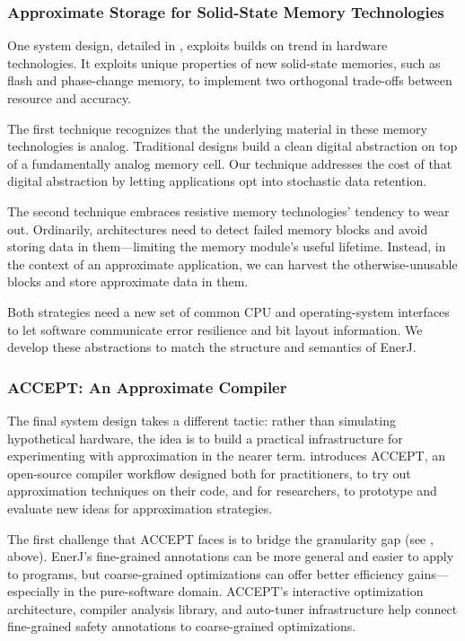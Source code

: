 \subsubsection{Approximate Storage for Solid-State Memory Technologies}

One system design, detailed in , exploits builds on trend in hardware technologies.
It exploits unique properties of new solid-state memories,
such as flash and phase-change memory,
to implement two orthogonal trade-offs between resource and accuracy.

The first technique recognizes that the underlying material in these memory
technologies is analog.
Traditional designs build a clean digital abstraction on top of a
fundamentally analog memory cell.
Our technique addresses the cost of that digital abstraction by letting
applications opt into stochastic data retention.

The second technique embraces resistive memory technologies' tendency to wear
out.
Ordinarily, architectures need to detect failed memory blocks and avoid
storing data in them---limiting the memory module's useful lifetime.
Instead, in the context of an approximate application, we can harvest the otherwise-unusable
blocks and store approximate data in them.

Both strategies need a new set of common CPU and operating-system interfaces
to let software communicate error resilience and bit layout information.
We develop these abstractions to match the structure and semantics of EnerJ.

\subsubsection{ACCEPT: An Approximate Compiler}

The final system design takes a different tactic:
rather than simulating hypothetical hardware,
the idea is to build a practical infrastructure for experimenting with
approximation in the nearer term.
 introduces ACCEPT, an open-source compiler workflow designed both for
practitioners, to try out approximation techniques on their code,
and for researchers, to prototype and evaluate new ideas for approximation
strategies.

The first challenge that ACCEPT faces is to bridge the granularity gap (see
, above).
EnerJ's fine-grained annotations can be more general and easier to apply to
programs,
but coarse-grained optimizations can offer better efficiency
gains---especially in the pure-software domain.
ACCEPT's interactive optimization architecture,
compiler analysis library,
and auto-tuner infrastructure help connect fine-grained safety annotations to
coarse-grained optimizations.

